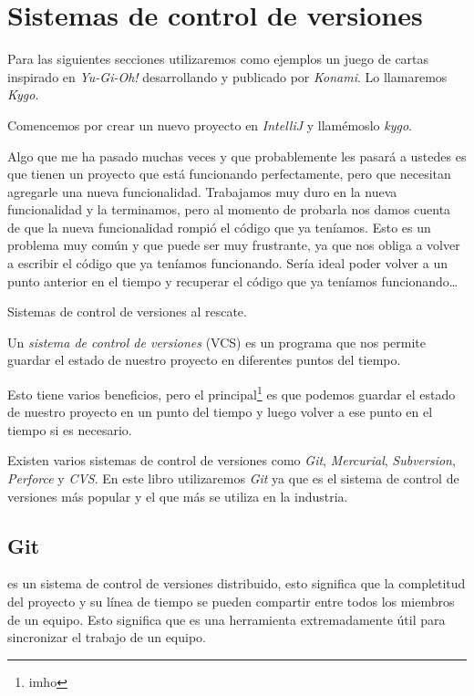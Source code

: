 \section{Sistemas de control de versiones}
  Para las siguientes secciones utilizaremos como ejemplos un juego de cartas inspirado en
  \textit{Yu-Gi-Oh!} desarrollando y publicado por \textit{Konami}.
  Lo llamaremos \textit{Kygo}.

  Comencemos por crear un nuevo proyecto en \textit{IntelliJ} y llamémoslo \textit{kygo}.

  Algo que me ha pasado muchas veces y que probablemente les pasará a ustedes es que tienen un
  proyecto que está funcionando perfectamente, pero que necesitan agregarle una nueva funcionalidad.
  Trabajamos muy duro en la nueva funcionalidad y la terminamos, pero al momento de probarla nos
  damos cuenta de que la nueva funcionalidad rompió el código que ya teníamos.
  Esto es un problema muy común y que puede ser muy frustrante, ya que nos obliga a volver a
  escribir el código que ya teníamos funcionando.
  Sería ideal poder volver a un punto anterior en el tiempo y recuperar el código que ya teníamos
  funcionando\dots

  Sistemas de control de versiones al rescate.

  \begin{defaultbox}
    Un \textit{sistema de control de versiones} (VCS) es un 
    programa que nos permite guardar el estado de nuestro proyecto en diferentes puntos del tiempo.
  \end{defaultbox}

  Esto tiene varios beneficios, pero el principal\footnote{imho} es que podemos guardar el estado de 
  nuestro proyecto en un punto del tiempo y luego volver a ese punto en el tiempo si es necesario.

  Existen varios sistemas de control de versiones como \textit{Git}, \textit{Mercurial}, 
  \textit{Subversion}, \textit{Perforce} y \textit{CVS}.
  En este libro utilizaremos \textit{Git} ya que es el sistema de control de versiones más popular
  y el que más se utiliza en la industria.

  \subsection{Git}
     es un sistema de control de versiones distribuido, esto significa que la completitud
    del proyecto y su línea de tiempo se pueden compartir entre todos los miembros de un equipo.
    Esto significa que es una herramienta extremadamente útil para sincronizar el trabajo de un 
    equipo.
    
